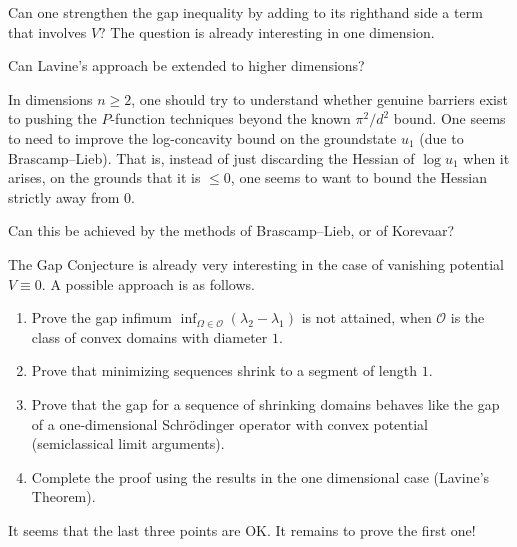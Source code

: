 \documentclass[12pt,letterpaper, reqno]{aimpl}
\begin{document}
\begin{prob}[3.25]
Can one strengthen the gap
inequality by adding to its righthand side a term that involves $V$?
The question is already interesting in one dimension.
\end{prob}

\begin{prob}[3.3]
 Can Lavine's approach be
extended to higher dimensions?
\end{prob}

\begin{problemblock}

In dimensions $n \geq 2$, one
should try to understand whether genuine barriers exist to pushing
the $P$-function techniques beyond the known $\pi^2/d^2$ bound. One
seems to need to improve the log-concavity bound on the groundstate
$u_1$ (due to Brascamp--Lieb). That is, instead of just discarding
the Hessian of $\log u_1$ when it arises, on the grounds that it is
$\leq 0$, one seems to want to bound the Hessian strictly away from
$0$.

\begin{problem}[3.35]
 Can this be achieved by the methods of Brascamp--Lieb, or of
Korevaar?
\end{problem}
\end{problemblock}

\begin{problemblock}
\begin{problem}[3.4]
  The Gap Conjecture is already
very interesting in the case of vanishing potential $V \equiv 0$. A
possible approach is as follows.
%
\begin{enumerate}
\item Prove the gap infimum $\inf_{\Omega \in \mathcal{O}} (\lambda_2-\lambda_1)$
is not attained, when $\mathcal{O}$ is the class of convex domains
with diameter $1$.

\item Prove that minimizing sequences shrink to a segment of
length $1$.

\item Prove that the gap for a sequence of shrinking domains
behaves like the gap of a one-dimensional Schr\"{o}dinger
operator with convex potential (semiclassical limit arguments).

\item Complete the proof using the results in the one dimensional case (Lavine's Theorem).
\end{enumerate}
\end{problem}
It seems that the last three points are OK. It remains to prove the first one!
\end{problemblock}
\end{document}
